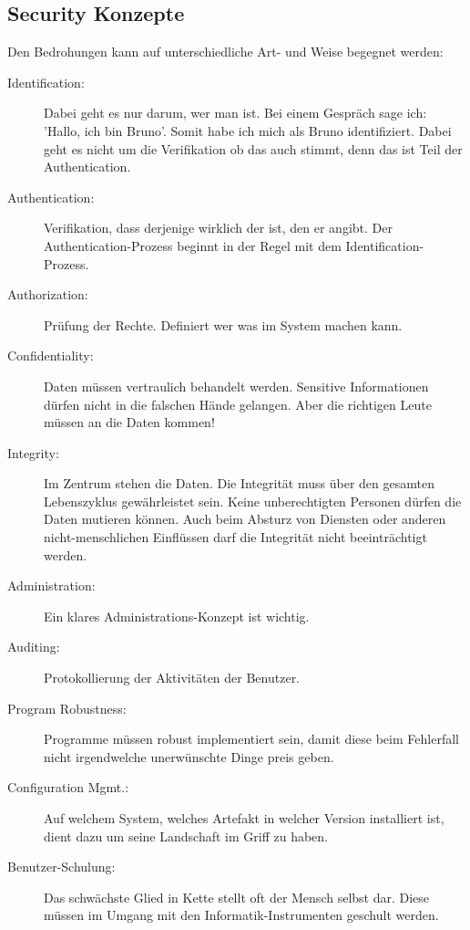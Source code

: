 \subsection{Security Konzepte}
Den Bedrohungen kann auf unterschiedliche Art- und Weise begegnet werden:
\begin{description}
	\item[Identification:] Dabei geht es nur darum, wer man ist. Bei einem Gespräch sage ich: 'Hallo, ich bin Bruno'. Somit habe ich mich als Bruno identifiziert. Dabei geht es nicht um die Verifikation ob das auch stimmt, denn das ist Teil der Authentication.
	
	\item[Authentication:] Verifikation, dass derjenige wirklich der ist, den er angibt. Der Authentication-Prozess beginnt in der Regel mit dem Identification-Prozess.
	
	\item[Authorization:] Prüfung der Rechte. Definiert wer was im System machen kann.
	
	\item[Confidentiality:] Daten müssen vertraulich behandelt werden. Sensitive Informationen dürfen nicht in die falschen Hände gelangen. Aber die richtigen Leute müssen an die Daten kommen!
	
	\item[Integrity:] Im Zentrum stehen die Daten. Die Integrität muss über den gesamten Lebenszyklus gewährleistet sein. Keine unberechtigten Personen dürfen die Daten mutieren können. Auch beim Absturz von Diensten oder anderen nicht-menschlichen Einflüssen darf die Integrität nicht beeinträchtigt werden.
	
	\item[Administration:] Ein klares Administrations-Konzept ist wichtig.
	
	\item[Auditing:] Protokollierung der Aktivitäten der Benutzer.
	
	\item[Program Robustness:] Programme müssen robust implementiert sein, damit diese beim Fehlerfall nicht irgendwelche unerwünschte Dinge preis geben.
	
	\item[Configuration Mgmt.:] Auf welchem System, welches Artefakt in welcher Version installiert ist, dient dazu um seine Landschaft im Griff zu haben.
	
	\item[Benutzer-Schulung:] Das schwächste Glied in Kette stellt oft der Mensch selbst dar. Diese müssen im Umgang mit den Informatik-Instrumenten geschult werden.
\end{description}

